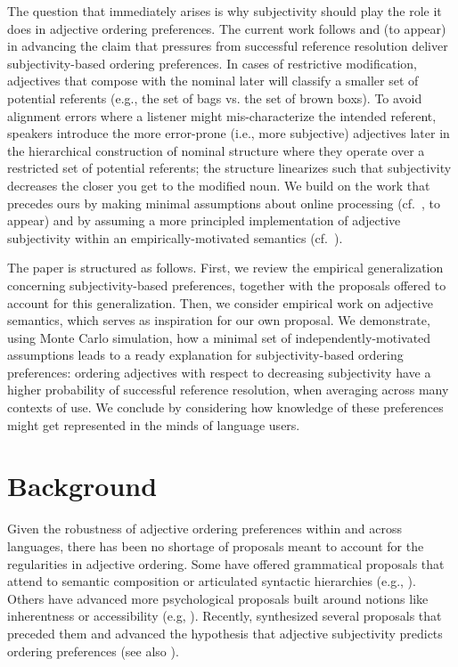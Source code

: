 \documentclass[10pt,a4paper]{article}
\begin{document}
The question that immediately arises is why subjectivity should play the role it does in adjective ordering preferences. The current work follows  and \citeauthor{scontrasetalSPadjectives} (to appear) in advancing the claim that pressures from successful reference resolution deliver subjectivity-based ordering preferences. In cases of restrictive modification, adjectives that compose with the nominal later will classify a smaller set of potential referents (e.g., the set of bags vs. the set of brown boxs). To avoid alignment errors where a listener might mis-characterize the intended referent, speakers introduce the more error-prone (i.e., more subjective) adjectives later in the hierarchical construction of nominal structure where they operate over a restricted set of potential referents; the structure linearizes such that subjectivity decreases the closer you get to the modified noun. 
We build on the work that precedes ours by making minimal assumptions about online processing (cf.~\citeauthor{scontrasetalSPadjectives}, to appear) and by assuming a more principled implementation of adjective subjectivity within an empirically-motivated semantics (cf.~).

The paper is structured as follows. First, we review the empirical generalization concerning subjectivity-based preferences, together with the proposals offered to account for this generalization. Then, we consider empirical work on adjective semantics, which serves as inspiration for our own proposal. We demonstrate, using Monte Carlo simulation, how a minimal set of independently-motivated assumptions leads to a ready explanation for subjectivity-based ordering preferences: ordering adjectives with respect to decreasing subjectivity have a higher probability of successful reference resolution, when averaging across many contexts of use. We conclude by considering how knowledge of these preferences might get represented in the minds of language users.

\section{Background}

Given the robustness of adjective ordering preferences within and across languages, there has been no shortage of proposals meant to account for the regularities in adjective ordering. Some have offered grammatical proposals that attend to semantic composition or articulated syntactic hierarchies (e.g., ). Others have advanced more psychological proposals built around notions like inherentness or accessibility (e.g, ). Recently,  synthesized several proposals that preceded them and advanced the hypothesis that adjective subjectivity predicts ordering preferences (see also ). 
\end{document}
